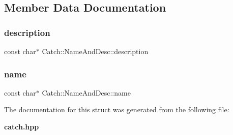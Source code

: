 \subsection{Member Data Documentation}
\mbox{\label{struct_catch_1_1_name_and_desc_a3463a23ff65ce494fc380452b57b7970}} 
\subsubsection{description}
{\footnotesize\ttfamily const char$\ast$ Catch\+::\+Name\+And\+Desc\+::description}

\mbox{\label{struct_catch_1_1_name_and_desc_a374b4ed8be3cf98be20ebde5273bde51}} 
\subsubsection{name}
{\footnotesize\ttfamily const char$\ast$ Catch\+::\+Name\+And\+Desc\+::name}



The documentation for this struct was generated from the following file\+:\begin{DoxyCompactItemize}
\item 
\textbf{ catch.\+hpp}\end{DoxyCompactItemize}
